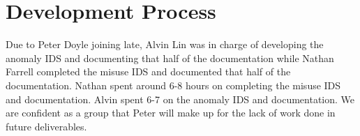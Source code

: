 \documentclass[letterpaper,12pt]{article}
\begin{document}
\section*{Development Process}
Due to Peter Doyle joining late, Alvin Lin was in charge of developing the
anomaly IDS and documenting that half of the documentation while Nathan Farrell
completed the misuse IDS and documented that half of the documentation. Nathan
spent around 6-8 hours on completing the misuse IDS and documentation. Alvin
spent 6-7 on the anomaly IDS and documentation. We are confident as a group
that Peter will make up for the lack of work done in future deliverables.
\end{document}

